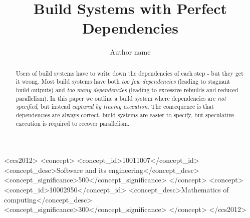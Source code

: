 \documentclass[acmsmall]{acmart}
\begin{document}
\newcommand{\Make}{\textsc{Make}\xspace}
\newcommand{\Rattle}{\textsc{Rattle}\xspace}
\newcommand{\Fabricate}{\textsc{Fabricate}\xspace}
\newcommand{\Bazel}{\textsc{Bazel}\xspace}
\newcommand{\Buck}{\textsc{Buck}\xspace}
\newcommand{\Shake}{\textsc{Shake}\xspace}
\newcommand{\libbigbro}{\textsc{libbigbro}\xspace}
\newcommand{\Fsatrace}{\textsc{Fsatrace}\xspace}
\newcommand{\tracedfs}{\textsc{Traced-Fs}\xspace}
\newcommand{\BuildXL}{\textsc{BuildXL}\xspace}
\newcommand{\Nix}{\textsc{Nix}\xspace}
\newcommand{\Memoize}{\textsc{Memoize}\xspace}


\title{Build Systems with Perfect Dependencies}

\author{Author name}


\begin{abstract}
Users of build systems have to write down the dependencies of each step - but they get it wrong.
Most build systems have both \emph{too few dependencies} (leading to stagnant build outputs) and \emph{too many dependencies} (leading to excessive rebuilds and reduced parallelism).
In this paper we outline a build system where dependencies are \emph{not specified}, but instead \emph{captured by tracing execution}.
The consequence is that dependencies are always correct, build systems are easier to specify, but speculative execution is required to recover parallelism.
\end{abstract}

\begin{CCSXML}
<ccs2012>
<concept>
<concept_id>10011007</concept_id>
 <concept_desc>Software and its engineering</concept_desc>
<concept_significance>500</concept_significance>
</concept>
<concept>
<concept_id>10002950</concept_id>
 <concept_desc>Mathematics of computing</concept_desc>
<concept_significance>300</concept_significance>
</concept>
</ccs2012>
\end{CCSXML}

\maketitle










\end{document}
